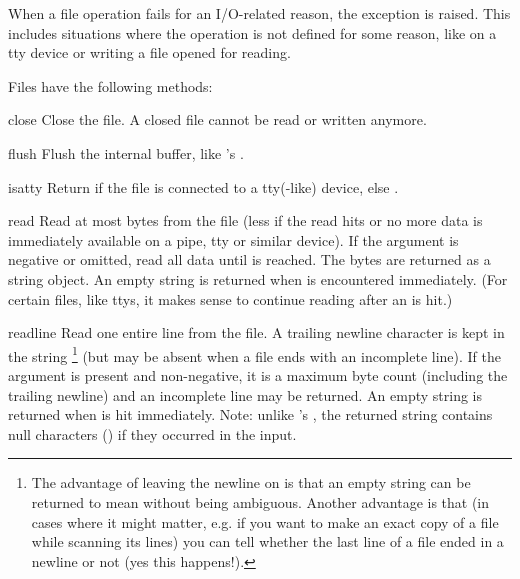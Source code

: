 When a file operation fails for an I/O-related reason, the exception
 is raised.  This includes situations where the
operation is not defined for some reason, like  on a tty
device or writing a file opened for reading.

Files have the following methods:


\renewcommand{\indexsubitem}{(file method)}

\begin{funcdesc}{close}{}
  Close the file.  A closed file cannot be read or written anymore.
\end{funcdesc}

\begin{funcdesc}{flush}{}
  Flush the internal buffer, like 's .
\end{funcdesc}

\begin{funcdesc}{isatty}{}
  Return  if the file is connected to a tty(-like) device, else
  .
\end{funcdesc}

\begin{funcdesc}{read}{}
  Read at most  bytes from the file (less if the read hits
  \EOF{} or no more data is immediately available on a pipe, tty or
  similar device).  If the  argument is negative or omitted,
  read all data until \EOF{} is reached.  The bytes are returned as a string
  object.  An empty string is returned when \EOF{} is encountered
  immediately.  (For certain files, like ttys, it makes sense to
  continue reading after an \EOF{} is hit.)
\end{funcdesc}

\begin{funcdesc}{readline}{}
  Read one entire line from the file.  A trailing newline character is
  kept in the string%
\footnote{The advantage of leaving the newline on is that an empty string 
	can be returned to mean \EOF{} without being ambiguous.  Another 
	advantage is that (in cases where it might matter, e.g. if you 
	want to make an exact copy of a file while scanning its lines) 
	you can tell whether the last line of a file ended in a newline
	or not (yes this happens!).}
  (but may be absent when a file ends with an
  incomplete line).  If the  argument is present and
  non-negative, it is a maximum byte count (including the trailing
  newline) and an incomplete line may be returned.
  An empty string is returned when \EOF{} is hit
  immediately.  Note: unlike 's , the returned
  string contains null characters () if they occurred in the
  input.
\end{funcdesc}

